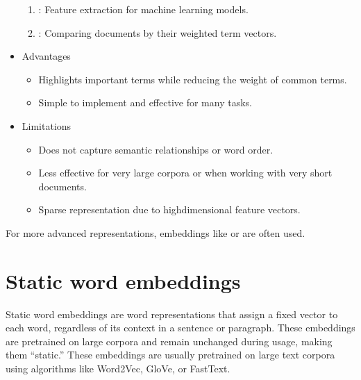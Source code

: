 \documentclass[letterpaper,11pt,english]{sphinxmanual}
\begin{document}
\begin{itemize}
\begin{enumerate}
\item {} 
\sphinxAtStartPar
{}: Feature extraction for machine learning models.

\item {} 
\sphinxAtStartPar
{}: Comparing documents by their weighted term vectors.

\end{enumerate}

\item {} 
\sphinxAtStartPar
Advantages
\begin{itemize}
\item {} 
\sphinxAtStartPar
Highlights important terms while reducing the weight of common terms.

\item {} 
\sphinxAtStartPar
Simple to implement and effective for many tasks.

\end{itemize}

\item {} 
\sphinxAtStartPar
Limitations
\begin{itemize}
\item {} 
\sphinxAtStartPar
Does not capture semantic relationships or word order.

\item {} 
\sphinxAtStartPar
Less effective for very large corpora or when working with very short documents.

\item {} 
\sphinxAtStartPar
Sparse representation due to high\sphinxhyphen{}dimensional feature vectors.

\end{itemize}

\end{itemize}

\sphinxAtStartPar
For more advanced representations, embeddings like  or  are often used.


\section{Static word embeddings}
\label{\detokenize{embedding:static-word-embeddings}}
\sphinxAtStartPar
Static word embeddings are word representations that assign a fixed vector to each word,
regardless of its context in a sentence or paragraph. These embeddings are pre\sphinxhyphen{}trained on
large corpora and remain unchanged during usage, making them “static.” These embeddings are
usually pre\sphinxhyphen{}trained on large text corpora using algorithms like Word2Vec, GloVe, or FastText.
\end{document}

